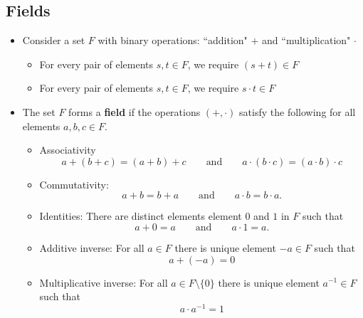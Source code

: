 \documentclass[11pt,twoside]{report}
\begin{document}
  \subsection{Fields} 
  
  \begin{itemize} 
  
\item   Consider a set $F$ with binary operations: ``addition"  $+$ and ``multiplication" $\cdot$
\begin{itemize}
\item For every pair of elements $s, t \in F$, we require $(s + t) \in F$
\item For every pair of elements $s, t \in F$, we require $s\cdot  t \in F$
\end{itemize}
\item The set $F$ forms a \textbf{field} if the operations $(+,\cdot)$ satisfy the following  for all elements $a,b,c \in F$. 
\begin{itemize}
\item Associativity
\[
 a + (b + c) = (a + b) + c  \qquad \text{and} \qquad  a \cdot (b \cdot c) = (a \cdot  b) \cdot c
 \]
 
\item Commutativity:
\[
a + b = b + a \qquad \text{and} \qquad  a\cdot b = b \cdot a.
\]
\item Identities: There are distinct elements element $0$ and $1$ in $ F$ such that  
\[
a + 0 =  a\qquad \text{and} \qquad  a\cdot 1 = a.
\]
\item Additive inverse:   For all $a \in F$ there is unique element $-a \in F$ such that 
\[
a + (-a) = 0 
\]

\item Multiplicative inverse:   For all $a \in F\setminus\{0\}$ there is unique element $a^{-1} \in F$ such that 
\[
a \cdot a^{-1}  = 1 
\]



\end{itemize}
\end{itemize}
\end{document}
